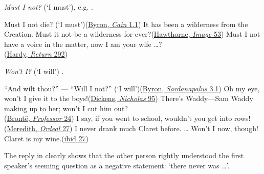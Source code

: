 \textit{Must I not?} (`I must'), e.g. .

\ea \label{ex:04-05}
\ea
Must I not die? \phantom{x} (`I must')\hfill(\href{https://archive.org/details/cainmystery01byro/page/10/mode/2up?q=\%22Must+I+not+die%3F\%22&view=theater}{Byron, \textit{Cain} 1.1})
\ex
It has been a wilderness from the Creation. Must it not be a wilderness for ever?\hfill(\href{https://archive.org/details/snowimageothertw0000hawt/page/52/mode/2up?q=\%22wilderness+from+the+creation\%22&view=theater}{Hawthorne, \textit{Image} 53})
\ex
Must I not have a voice in the matter, now I am your wife {\dots}?\\\hfill(\href{https://archive.org/details/returnofthenativ00harduoft/page/224/mode/2up?q=\%22Must+I+not+have+a+voice\%22&view=theater}{Hardy, \textit{Return} 292}) %
\z
\z

\textit{Won't I?} (`I will') .

\ea \label{ex:04-08}
\ea
``And wilt thou?'' --- ``Will I not?'' \phantom{x}(`I will')\hfill(\href{https://archive.org/details/in.ernet.dli.2015.285363/page/n459/mode/2up?q=\%22And+wilt+thou%3F++Will+I+not\%22&view=theater}{Byron, \textit{Sardanapalus} 3.1})
\ex
Oh my eye, won't I give it to the boys!\hfill(\href{https://archive.org/details/lifeadventuresofdickrich/page/106/mode/2up?q=\%22won%27t+I+give+it+to+the+boys\%22&view=theater}{Dickens, \textit{Nicholas} 95})
\ex
There's Waddy---Sam Waddy making up to her; won't I cut him out?\\\hfill(\href{https://archive.org/details/professortale01bron/page/46/mode/2up?q=\%22sam+waddy+making+up\%22&view=theater}{Brontë, \textit{Professor} 24}) %
\ex
I say, if you went to school, wouldn't you get into rows!\\\hfill(\href{https://archive.org/details/ordealofrichardf01mere/page/118/mode/2up?q=\%22get+into+rows\%22&view=theater}{Meredith, \textit{Ordeal} 27}) %
\ex
I never drank much Claret before. {\dots} Won't I now, though! Claret is my wine.\hfill(\href{https://archive.org/details/ordealofrichardf01mere/page/120/mode/2up?q=\%22Won%27t+I+now%2C+though%21\%22&view=theater}{ibid 27}) %
\z
\z
 
The reply in  clearly shows that the other person rightly understood the first speaker's seeming question as a negative statement: `there never was {\dots}'.

